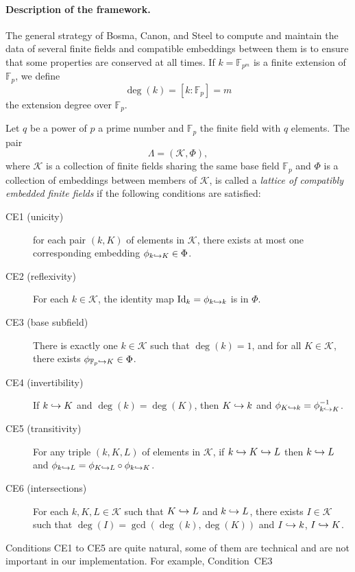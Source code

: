 \paragraph{Description of the framework.} The general strategy of Bosma, Canon,
and Steel to compute and maintain the data of several finite fields and
compatible embeddings between them is to ensure that some properties are
conserved at all times. If $k=\mathbb{F}_{p^m}$ is a finite extension of
$\mathbb{F}_p$, we define
\[
  \deg (k) = \left[ k:\mathbb{F}_p \right] = m
\]
the extension degree over $\mathbb{F}_p$.
\begin{defi}
  \label{defi:lattice-bcs}
  Let $q$ be a power of $p$ a prime number and $\mathbb{F}_p$ the finite field
  with $q$ elements. The pair
\[
  \Lambda = (\mathcal K, \Phi),
\]
where $\mathcal K$ is a collection of finite fields sharing the same base field
$\mathbb{F}_p$ and $\Phi$ is a collection of embeddings between members of
$\mathcal K$,
is called a \emph{lattice of compatibly embedded finite fields} if the following
conditions are satisfied:
\begin{description}
  \item[CE1 (unicity)] for each pair $(k, K)$ of elements in $\mathcal K$, there exists
    at most one corresponding embedding $\phi_{k\hookrightarrow K}\in\Phi$.
    \item[CE2 (reflexivity)] For each $k\in \mathcal K$, the identity map
    $\operatorname{Id}_k=\phi_{k\hookrightarrow k}$ is in $\Phi$.
  \item[CE3 (base subfield)] There is exactly one $k\in \mathcal K$ such that
    $\deg(k)=1$, and for all $K\in \mathcal K$, there exists $\phi_{\mathbb{F}_p\hookrightarrow K}\in\Phi$.
  \item[CE4 (invertibility)] If $k\hookrightarrow K$ and $\deg(k)=\deg(K)$, then $K\hookrightarrow k$ and
    $\phi_{K\hookrightarrow k}=\phi_{k\hookrightarrow K}^{-1}$.
  \item[CE5 (transitivity)] For any triple $(k, K, L)$ of elements in $\mathcal
    K$, if $k\hookrightarrow K\hookrightarrow L$ then $k\hookrightarrow L$ and
    $\phi_{k\hookrightarrow L}=\phi_{K\hookrightarrow L}\circ\phi_{k\hookrightarrow K}$.
  \item[CE6 (intersections)] For each $k, K, L\in \mathcal K$ such that $K\hookrightarrow L$ and
    $k\hookrightarrow L$, there exists $I\in \mathcal K$ such that
    $\deg(I)=\gcd(\deg(k), \deg(K))$
    and $I\hookrightarrow k$, $I\hookrightarrow K$.
\end{description}
\end{defi}
Conditions CE1 to CE5 are quite natural, some of them are technical and
are not important in our implementation. For example, Condition~CE3
